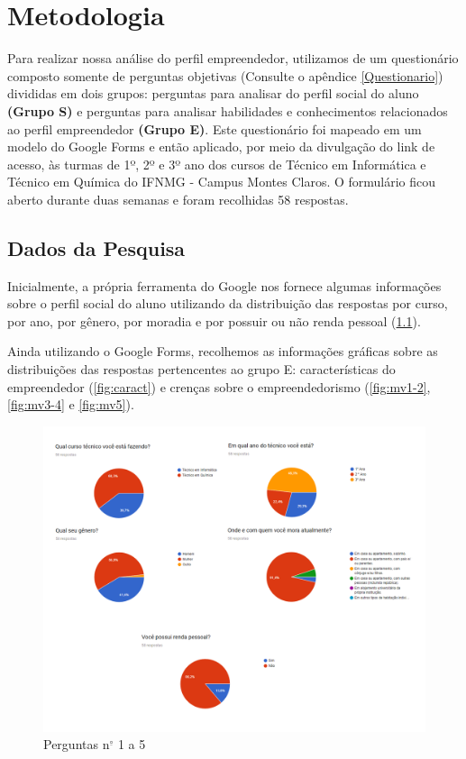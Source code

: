 \chapter{Metodologia}\label{capitulo2}

Para realizar nossa análise do perfil empreendedor, utilizamos de um questionário composto somente de perguntas objetivas (Consulte o apêndice \ref{Questionario}) divididas em dois grupos: perguntas para analisar do perfil social do aluno \textbf{(Grupo S)} e perguntas para analisar habilidades e conhecimentos relacionados ao perfil empreendedor \textbf{(Grupo E)}. Este questionário foi mapeado em um modelo do Google Forms e então aplicado, por meio da divulgação do link de acesso, às turmas de 1º, 2º e 3º ano dos cursos de Técnico em Informática e Técnico em Química do IFNMG - Campus Montes Claros. O formulário ficou aberto durante duas semanas e foram recolhidas 58 respostas.

\section{Dados da Pesquisa}
Inicialmente, a própria ferramenta do Google nos fornece algumas informações sobre o perfil social do aluno utilizando da distribuição das respostas por curso, por ano, por gênero, por moradia e por possuir ou não renda pessoal (\ref{fig:quest1-5}).

Ainda utilizando o Google Forms, recolhemos as informações gráficas sobre as distribuições das respostas pertencentes ao grupo E: características do empreendedor (\ref{fig:caract}) e crenças sobre o empreendedorismo (\ref{fig:mv1-2}, \ref{fig:mv3-4} e \ref{fig:mv5}).

\begin{figure}[!htb]
    \centering
    \includegraphics[width=1.0\textwidth]{img/quest1-5.png}
    \caption{Perguntas n$^{\underline{\circ}}$ 1 a 5}
    \label{fig:quest1-5}
\end{figure}

